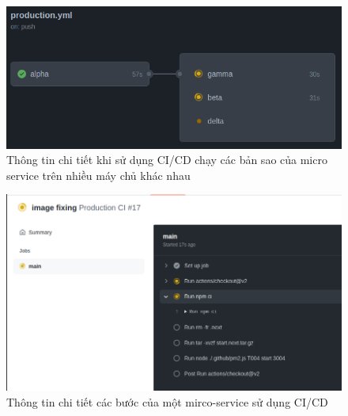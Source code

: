 \clearpage
\begin{figure}[h!]\fontsize{13px}{13px}\selectfont
	\begin{center}	
		\includegraphics[width=\textwidth]{./results/jobs}
		\caption{Thông tin chi tiết khi sử dụng CI/CD chạy các bản sao của micro service trên nhiều máy chủ khác nhau}
	\end{center}
\end{figure}


\begin{figure}[h!]\fontsize{13px}{13px}\selectfont
	\begin{center}	
		\includegraphics[width=\textwidth]{./results/production}
		\caption{Thông tin chi tiết các bước của một mirco-service sử dụng CI/CD}
	\end{center}
\end{figure}


